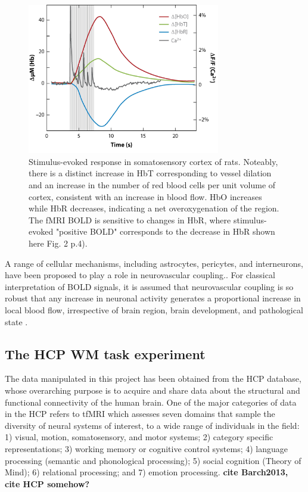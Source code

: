 \begin{figure}[H]
    \centering
    \includegraphics[width = 0.75\textwidth]{assets/images/Hb_flactuations_BOLD.jpg}
    \caption{Stimulus-evoked response in somatosensory cortex of rats. Noteably, there is a distinct increase in \gls{HbT} corresponding to vessel dilation and an increase in the number of red blood cells per unit volume of cortex, consistent with an increase in blood flow. \gls{HbO} increases while \gls{HbR} decreases, indicating a net overoxygenation of the region. The \gls{fMRI} \gls{BOLD} is sensitive to changes in \gls{HbR}, where stimulus-evoked "positive \gls{BOLD}" corresponds to the decrease in \gls{HbR} shown here \cite{Hillman2007} Fig. 2 p.4).}
    \label{fig:BOLD}
\end{figure}

A range of cellular mechanisms, including astrocytes, pericytes, and interneurons, have been proposed to play a role in neurovascular coupling.\cite{Hillman2014}. For classical interpretation of \gls{BOLD} signals, it is assumed that neurovascular coupling is so robust that any increase in neuronal activity generates a proportional increase in local blood flow, irrespective of brain region, brain development, and pathological state \cite{Logothetis2010}.

\subsection{The HCP WM task experiment}

The data manipulated in this project has been obtained from the \gls{HCP} database, whose overarching purpose is to acquire and share data about the structural and functional connectivity of the human brain. One of the major categories of data in the \gls{HCP} refers to \gls{tfMRI} which assesses seven domains that sample the diversity of neural systems of interest, to a wide range of individuals in the field: 1) visual, motion, somatosensory, and motor systems; 2) category specific representations; 3) working memory or cognitive control systems; 4) language processing (semantic and phonological processing); 5) social cognition (Theory of Mind); 6) relational processing; and 7) emotion processing. \textbf{cite Barch2013, cite HCP somehow?}

